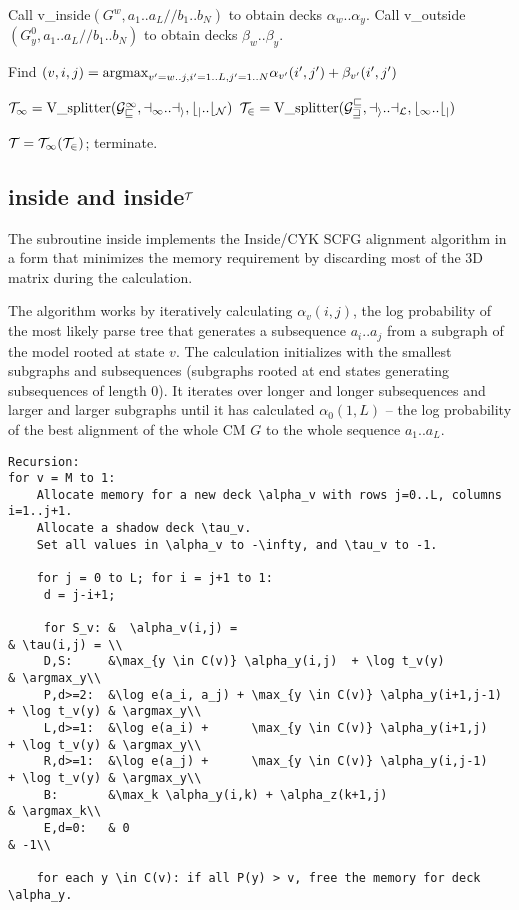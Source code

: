 \documentclass[11pt]{article}
\begin{document}
Call v\_inside$(G^w, a_1..a_L//b_1..b_N)$ to obtain decks $\alpha_w..\alpha_y$.
Call v\_outside$(G^0_y, a_1..a_L//b_1..b_N)$ to obtain decks $\beta_w..\beta_y$.

Find $(v,i,j) = \mbox{\rm{argmax}}_{v'=w..j, i'=1..L, j'=1..N} \alpha_{v'}(i',j') + \beta_{v'}(i',j')$

$\cal{T}_1 = \mbox{V\_splitter}(G^1_v, a_1..a_i, b_j..b_N)$
$\cal{T}_2 = \mbox{V\_splitter}(G^v_w, a_i..a_L, b_1..b_j)$

$\cal{T} = \cal{T}_1 (\cal{T}_2)$; terminate.

\subsection{inside and inside$^{\cal{T}}$}

The subroutine inside implements the Inside/CYK SCFG alignment
algorithm in a form that minimizes the memory requirement by
discarding most of the 3D matrix during the calculation.

The algorithm works by iteratively calculating $\alpha_v(i,j)$, the
log probability of the most likely parse tree that generates a
subsequence $a_i..a_j$ from a subgraph of the model rooted at state
$v$. The calculation initializes with the smallest subgraphs and
subsequences (subgraphs rooted at end states generating subsequences
of length 0). It iterates over longer and longer subsequences and
larger and larger subgraphs until it has calculated $\alpha_0(1,L)$ --
the log probability of the best alignment of the whole CM $G$ to the
whole sequence $a_1..a_L$.

\begin{verbatim}
Recursion:
for v = M to 1:
    Allocate memory for a new deck \alpha_v with rows j=0..L, columns i=1..j+1.
    Allocate a shadow deck \tau_v.
    Set all values in \alpha_v to -\infty, and \tau_v to -1.

    for j = 0 to L; for i = j+1 to 1:
     d = j-i+1;
     
     for S_v: &  \alpha_v(i,j) =                                                    & \tau(i,j) = \\
     D,S:     &\max_{y \in C(v)} \alpha_y(i,j)  + \log t_v(y)	                    & \argmax_y\\
     P,d>=2:  &\log e(a_i, a_j) + \max_{y \in C(v)} \alpha_y(i+1,j-1) + \log t_v(y) & \argmax_y\\
     L,d>=1:  &\log e(a_i) +      \max_{y \in C(v)} \alpha_y(i+1,j)   + \log t_v(y) & \argmax_y\\
     R,d>=1:  &\log e(a_j) +      \max_{y \in C(v)} \alpha_y(i,j-1)   + \log t_v(y) & \argmax_y\\
     B:       &\max_k \alpha_y(i,k) + \alpha_z(k+1,j)                               & \argmax_k\\
     E,d=0:   & 0                                                                   & -1\\

    for each y \in C(v): if all P(y) > v, free the memory for deck \alpha_y.
\end{verbatim}
\end{document}
